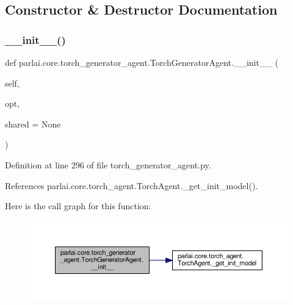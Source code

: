 \subsection{Constructor \& Destructor Documentation}
\mbox{\label{classparlai_1_1core_1_1torch__generator__agent_1_1TorchGeneratorAgent_a60f9613d8d2761569c8862b690b24bce}} 
\subsubsection{\texorpdfstring{\+\_\+\+\_\+init\+\_\+\+\_\+()}{\_\_init\_\_()}}
{\footnotesize\ttfamily def parlai.\+core.\+torch\+\_\+generator\+\_\+agent.\+Torch\+Generator\+Agent.\+\_\+\+\_\+init\+\_\+\+\_\+ (\begin{DoxyParamCaption}\item[{}]{self,  }\item[{}]{opt,  }\item[{}]{shared = {\ttfamily None} }\end{DoxyParamCaption})}



Definition at line 296 of file torch\+\_\+generator\+\_\+agent.\+py.



References parlai.\+core.\+torch\+\_\+agent.\+Torch\+Agent.\+\_\+get\+\_\+init\+\_\+model().

Here is the call graph for this function\+:
\nopagebreak
\begin{figure}[H]
\begin{center}
\leavevmode
\includegraphics[width=350pt]{classparlai_1_1core_1_1torch__generator__agent_1_1TorchGeneratorAgent_a60f9613d8d2761569c8862b690b24bce_cgraph}
\end{center}
\end{figure}


